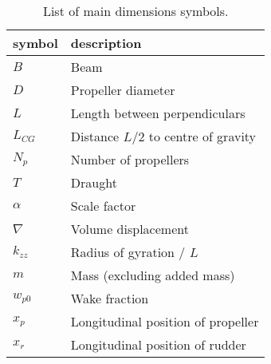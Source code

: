 \begin{table}[h]
\footnotesize
\caption{List of main dimensions symbols.}
    \label{tab:nomenclature}

    \centering
    \begin{tabular}{|T|T|}
\hline


symbol
&

description
\\
\hline

\(B\)
&

Beam
\\
\hline

\(D\)
&

Propeller diameter
\\
\hline

\(L\)
&

Length between perpendiculars
\\
\hline

\(L_{CG}\)
&

Distance \(L/2\) to centre of gravity
\\
\hline

\(N_p\)
&

Number of propellers
\\
\hline

\(T\)
&

Draught
\\
\hline

\(\alpha\)
&

Scale factor
\\
\hline

\(\nabla\)
&

Volume displacement
\\
\hline

\(k_{zz}\)
&

Radius of gyration / \(L\)
\\
\hline

\(m\)
&

Mass (excluding added mass)
\\
\hline

\(w_{p0}\)
&

Wake fraction
\\
\hline

\(x_{p}\)
&

Longitudinal position of propeller
\\
\hline

\(x_{r}\)
&

Longitudinal position of rudder
\\
\hline
\end{tabular}
\end{table}
